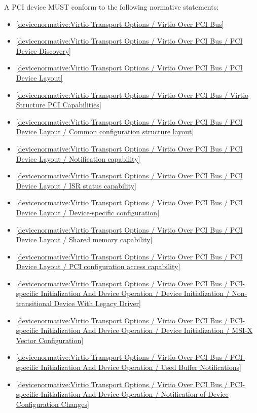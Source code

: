 A PCI device MUST conform to the following normative statements:

\begin{itemize}
\item \ref{devicenormative:Virtio Transport Options / Virtio Over PCI Bus}
\item \ref{devicenormative:Virtio Transport Options / Virtio Over PCI Bus / PCI Device Discovery}
\item \ref{devicenormative:Virtio Transport Options / Virtio Over PCI Bus / PCI Device Layout}
\item \ref{devicenormative:Virtio Transport Options / Virtio Over PCI Bus / Virtio Structure PCI Capabilities}
\item \ref{devicenormative:Virtio Transport Options / Virtio Over PCI Bus / PCI Device Layout / Common configuration structure layout}
\item \ref{devicenormative:Virtio Transport Options / Virtio Over PCI Bus / PCI Device Layout / Notification capability}
\item \ref{devicenormative:Virtio Transport Options / Virtio Over PCI Bus / PCI Device Layout / ISR status capability}
\item \ref{devicenormative:Virtio Transport Options / Virtio Over PCI Bus / PCI Device Layout / Device-specific configuration}
\item \ref{devicenormative:Virtio Transport Options / Virtio Over PCI Bus / PCI Device Layout / Shared memory capability}
\item \ref{devicenormative:Virtio Transport Options / Virtio Over PCI Bus / PCI Device Layout / PCI configuration access capability}
\item \ref{devicenormative:Virtio Transport Options / Virtio Over PCI Bus / PCI-specific Initialization And Device Operation / Device Initialization / Non-transitional Device With Legacy Driver}
\item \ref{devicenormative:Virtio Transport Options / Virtio Over PCI Bus / PCI-specific Initialization And Device Operation / Device Initialization / MSI-X Vector Configuration}
\item \ref{devicenormative:Virtio Transport Options / Virtio Over PCI Bus / PCI-specific Initialization And Device Operation / Used Buffer Notifications}
\item \ref{devicenormative:Virtio Transport Options / Virtio Over PCI Bus / PCI-specific Initialization And Device Operation / Notification of Device Configuration Changes}
\end{itemize}

